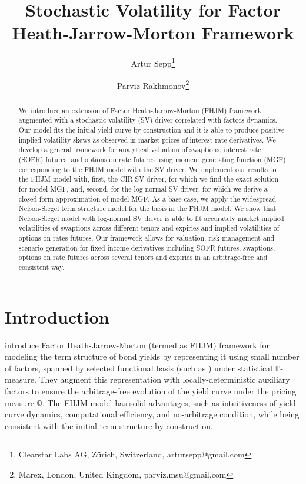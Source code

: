 \documentclass[pdftex,11pt,a4paper] {article}
\date{\displaydate{date}}
\begin{document}
\title{Stochastic Volatility for Factor Heath-Jarrow-Morton Framework}


\author{Artur Sepp\thanks{Clearstar Labs AG, Z\"{u}rich, Switzerland, artursepp@gmail.com} \and Parviz Rakhmonov\thanks{Marex, London, United Kingdom, parviz.msu@gmail.com}}


\maketitle


 
\begin{abstract}
We introduce an extension of Factor Heath-Jarrow-Morton (FHJM) framework augmented with a stochastic volatility (SV) driver correlated with factors dynamics. Our model fits the initial yield curve by construction and it is able to produce positive implied volatility skews as observed in market prices of interest rate derivatives. We develop a general framework for analytical valuation of swaptions, interest rate (SOFR) futures, and options on rate futures using moment generating function (MGF) corresponding to the FHJM model with the SV driver. We implement our results to the FHJM model with, first, the CIR SV driver, for which we find the exact solution for model MGF, and, second, for the log-normal SV driver, for which we derive a closed-form approximation of model MGF. As a base case, we apply the widespread Nelson-Siegel term structure model for the basis in the FHJM model. We show that Nelson-Siegel model with log-normal SV driver is able to fit accurately market implied volatilities of swaptions across different tenors and expiries and implied volatilities of options on rates futures. Our framework allows for valuation, risk-management and scenario generation for fixed income derivatives including SOFR futures, swaptions, options on rate futures across several tenors and expiries in an arbitrage-free and consistent way.

\end{abstract}




\section{Introduction}
\cite{Lyashenko2023} introduce Factor Heath-Jarrow-Morton (termed as FHJM) framework for modeling the term structure of bond yields by representing it using small number of factors, spanned by selected  functional basis (such as \cite{NS1987}) under statistical $\mathbb{P}$-measure. They augment this representation with locally-deterministic auxiliary factors to ensure the arbitrage-free evolution of the yield curve under the pricing measure $\mathbb{Q}$. The FHJM model has solid advantages, such as intuitiveness of yield curve dynamics, computational efficiency, and no-arbitrage condition, while being consistent with the initial term structure by construction. 
\end{document}
